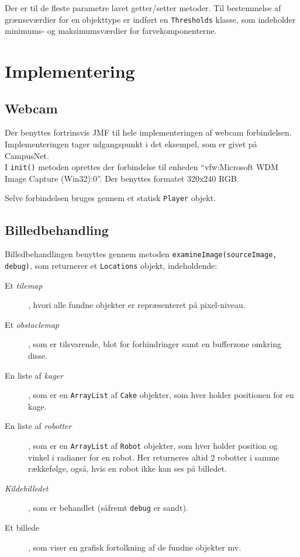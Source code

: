 Der er til de fleste parametre lavet getter/setter metoder. Til bestemmelse af grænseværdier for en objekttype er indført en \texttt{Thresholds} klasse, som indeholder minimums- og maksimumsværdier for farvekomponenterne.

\section{Implementering}
\subsection{Webcam}
Der benyttes fortrinsvis JMF til hele implementeringen af webcam forbindelsen. Implementeringen tager udgangspunkt i det eksempel, som er givet på CampusNet.\\
I \texttt{init()} metoden oprettes der forbindelse til enheden "`vfw:Microsoft WDM Image Capture (Win32):0"'. Der benyttes formatet 320x240 RGB.

Selve forbindelsen bruges gennem et statisk \texttt{Player} objekt.

\subsection{Billedbehandling}
Billedbehandlingen benyttes gennem metoden \texttt{examineImage(sourceImage, debug)}, som returnerer et \texttt{Locations} objekt, indeholdende:
\begin{description}
	\item[Et \textit{tilemap}], hvori alle fundne objekter er repræsenteret på pixel-niveau.
	\item[Et \textit{obstaclemap}], som er tilsvarende, blot for forhindringer samt en bufferzone omkring disse.
	\item[En liste af \textit{kager}], som er en \texttt{ArrayList} af \texttt{Cake} objekter, som hver holder positionen for en kage.
	\item[En liste af \textit{robotter}], som er en \texttt{ArrayList} af \texttt{Robot} objekter, som hver holder position og vinkel i radianer for en robot. Her returneres altid 2 robotter i samme rækkefølge, også, hvis en robot ikke kan ses på billedet.
	\item[\textit{Kildebilledet}], som er behandlet (såfremt \texttt{debug} er sandt).
	\item[Et billede], som viser en grafisk fortolkning af de fundne objekter mv.
\end{description}

